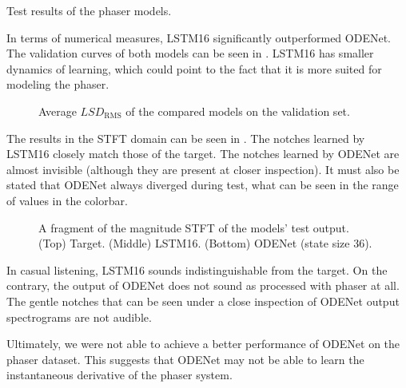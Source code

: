 \begin{table}[]
    \caption{Test results of the phaser models.}
    \centering
    
    \label{tab:phaser_results}
\end{table}

In terms of numerical measures, \ac{LSTM}16 significantly outperformed ODENet. The validation curves of both models can be seen in . \ac{LSTM}16 has smaller dynamics of learning, which could point to the fact that it is more suited for modeling the phaser.

\begin{figure}
    \centering
    
    \caption{Average $LSD_\text{RMS}$ of the compared models on the validation set.}
    \label{fig:phaser_lstm_vs_fe}
\end{figure}

The results in the \ac{STFT} domain can be seen in . The notches learned by \ac{LSTM}16 closely match those of the target. The notches learned by ODENet are almost invisible (although they are present at closer inspection). It must also be stated that ODENet always diverged during test, what can be seen in the range of values in the colorbar.

\newcommand{\scaleboxsizee}{0.8}
\begin{figure}
    \centering
    \begin{subfigure}{0.7\textwidth}
        \centering
        \scalebox{0.81}{}
    \end{subfigure}
    \begin{subfigure}{0.7\textwidth}
        \centering
        \scalebox{\scaleboxsizee}{}
    \end{subfigure}
    \begin{subfigure}{0.7\textwidth}
        \centering
        \scalebox{\scaleboxsizee}{}
    \end{subfigure}
    \caption{A fragment of the magnitude \ac{STFT} of the models' test output. (Top) Target. (Middle) \ac{LSTM}16. (Bottom) ODENet (state size 36).}
    \label{fig:phaser_test_spectrograms}
\end{figure}

In casual listening, \ac{LSTM}16 sounds indistinguishable from the target. On the contrary, the output of ODENet does not sound as processed with phaser at all. The gentle notches that can be seen under a close inspection of ODENet output spectrograms are not audible.

Ultimately, we were not able to achieve a better performance of ODENet on the phaser dataset. This suggests that ODENet may not be able to learn the instantaneous derivative of the phaser system.
